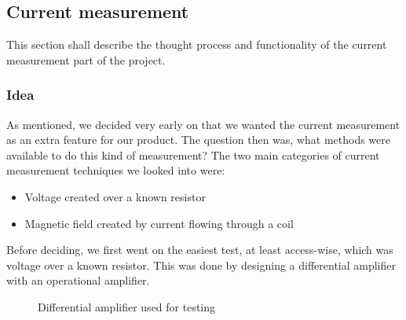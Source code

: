 \subsection{Current measurement}
\label{sec:method_current}
This section shall describe the thought process and functionality of the current measurement part of the project.

\subsubsection{Idea}
As mentioned, we decided very early on that we wanted the current measurement as an extra feature for our product. The question then was, what methods were available to do this kind of measurement?
The two main categories of current measurement techniques we looked into were:
\begin{itemize}
    \item Voltage created over a known resistor
    \item Magnetic field created by current flowing through a coil
\end{itemize}

Before deciding, we first went on the easiest test, at least access-wise, which was voltage over a known resistor. This was done by designing a differential amplifier with an operational amplifier.
\begin{figure}[h]
    \centering
    \caption{Differential amplifier used for testing}
    \label{fig:diff}
\end{figure}

